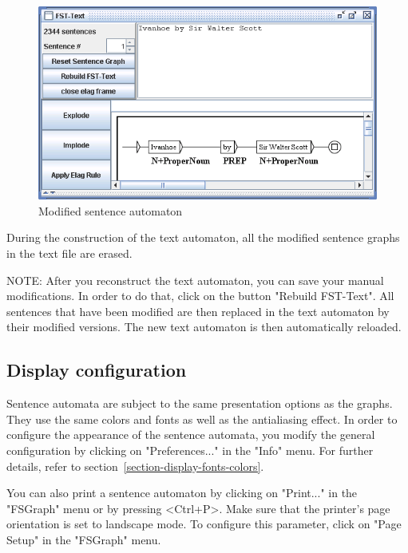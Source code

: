 \begin{figure}[!ht]
\begin{center}
\includegraphics[width=15cm]{resources/img/fig7-24.png}
\caption{Modified sentence automaton\label{fig-modified-sentence-automaton}}
\end{center}
\end{figure}

\bigskip
\noindent During the construction of the text automaton, all the modified
sentence graphs in the text file are erased.

\bigskip
\noindent NOTE: After you reconstruct the text automaton, you can save your
manual modifications. In order to do that, click on the button "Rebuild
FST-Text". All sentences that have been modified are then replaced in the text
automaton by their modified versions. The new text automaton is then
automatically reloaded.

\subsection{Display configuration}
Sentence automata are subject to the same presentation options as the
graphs. They use the same colors and fonts as well as the antialiasing effect. In
order to configure the appearance of the sentence automata, you  modify
the general configuration by clicking on "Preferences..." in the "Info" menu.
For further details, refer to section~\ref{section-display-fonts-colors}.

\bigskip
\noindent You can also print a sentence automaton by clicking on "Print..." in
the "FSGraph" menu or by pressing  <Ctrl+P>. Make sure that the printer's page
orientation is set to landscape mode.  To
configure this parameter, click on "Page Setup" in the
"FSGraph" menu.

